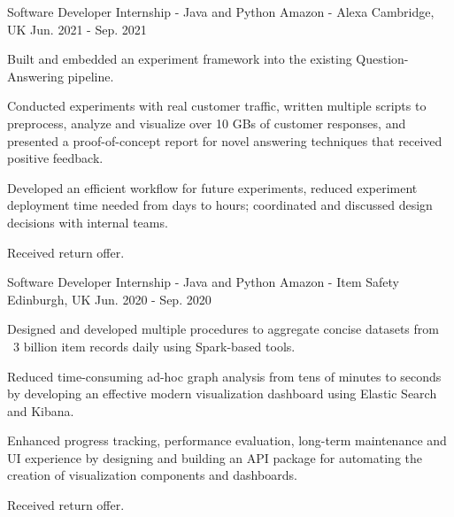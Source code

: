 

\begin{cventries}


  \cventry
    {Software Developer Internship - Java and Python} %
    {Amazon - Alexa} %
    {Cambridge, UK} %
    {Jun. 2021 - Sep. 2021} %
    {
      \begin{cvitems} %
        \item {Built and embedded an experiment framework into the existing Question-Answering pipeline.}
        \item {Conducted experiments with real customer traffic, written multiple scripts to preprocess, analyze and visualize over 10 GBs of customer responses, and presented a proof-of-concept report for novel answering techniques that received positive feedback.}
        \item {Developed an efficient workflow for future experiments, reduced experiment deployment time needed from days to hours; coordinated and discussed design decisions with internal teams.}
        \item {Received return offer.}
      \end{cvitems}
    }

  \cventry
    {Software Developer Internship - Java and Python} %
    {Amazon - Item Safety} %
    {Edinburgh, UK} %
    {Jun. 2020 - Sep. 2020} %
    {
      \begin{cvitems} %
        \item {Designed and developed multiple procedures to aggregate concise datasets from ~3 billion item records daily using Spark-based tools.}
        \item {Reduced time-consuming ad-hoc graph analysis from tens of minutes to seconds by developing an effective modern visualization dashboard using Elastic Search and Kibana.}
        \item {Enhanced progress tracking, performance evaluation, long-term maintenance and UI experience by designing and building an API package for automating the creation of visualization components and dashboards.}
        \item {Received return offer.}
      \end{cvitems}
    }


\end{cventries}
